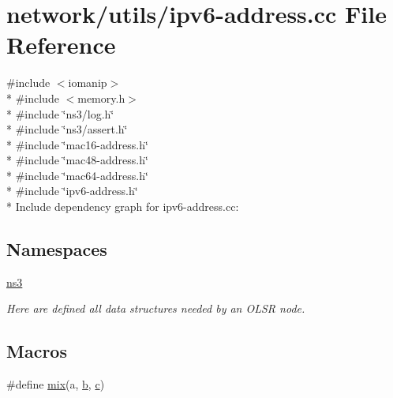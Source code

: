 \hypertarget{ipv6-address_8cc}{}\section{network/utils/ipv6-\/address.cc File Reference}
\label{ipv6-address_8cc}
{\ttfamily \#include $<$iomanip$>$}\\*
{\ttfamily \#include $<$memory.\+h$>$}\\*
{\ttfamily \#include \char`\"{}ns3/log.\+h\char`\"{}}\\*
{\ttfamily \#include \char`\"{}ns3/assert.\+h\char`\"{}}\\*
{\ttfamily \#include \char`\"{}mac16-\/address.\+h\char`\"{}}\\*
{\ttfamily \#include \char`\"{}mac48-\/address.\+h\char`\"{}}\\*
{\ttfamily \#include \char`\"{}mac64-\/address.\+h\char`\"{}}\\*
{\ttfamily \#include \char`\"{}ipv6-\/address.\+h\char`\"{}}\\*
Include dependency graph for ipv6-\/address.cc\+:
\subsection*{Namespaces}
\begin{DoxyCompactItemize}
\item 
 \hyperlink{namespacens3}{ns3}
\begin{DoxyCompactList}\small\item\em Here are defined all data structures needed by an O\+L\+SR node. \end{DoxyCompactList}\end{DoxyCompactItemize}
\subsection*{Macros}
\begin{DoxyCompactItemize}
\item 
\#define \hyperlink{ipv6-address_8cc_afd9fa1747724ec6142812721997394c3}{mix}(a,  \hyperlink{lte__pathloss_8m_a21ad0bd836b90d08f4cf640b4c298e7c}{b},  \hyperlink{mmwave_2model_2fading-traces_2fading__trace__generator_8m_ae0323a9039add2978bf5b49550572c7c}{c})
\end{DoxyCompactItemize}
